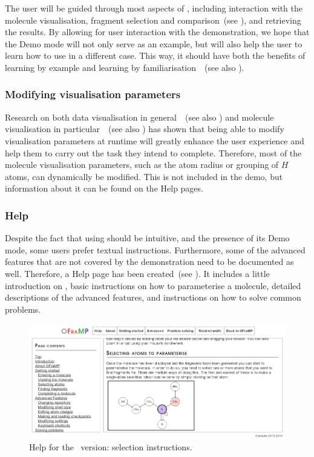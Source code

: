 The user will be guided through most aspects of \oframp, including interaction with the molecule visualisation, fragment selection and comparison~(see ), and retrieving the results. By allowing for user interaction with the demonstration, we hope that the Demo mode will not only serve as an example, but will also help the user to learn how to use \oframp{} in a different case. This way, it should have both the benefits of learning by example and learning by familiarisation~\cite{sweller1994cognitive}~(see also ).

\subsubsection{Modifying visualisation parameters}
Research on both data visualisation in general~\cite{gallopoulos1994computer}~(see also ) and molecule visualisation in particular~\cite{aksela2008computer,taylor2013interface}~(see also ) has shown that being able to modify visualisation parameters at runtime will greatly enhance the user experience and help them to carry out the task they intend to complete. Therefore, most of the molecule visualisation parameters, such as the atom radius or grouping of $H$ atoms, can dynamically be modified. This is not included in the demo, but information about it can be found on the \oframp{} Help pages.

\subsubsection{Help}
Despite the fact that using \oframp{} should be intuitive, and the presence of its Demo mode, some users prefer textual instructions. Furthermore, some of the advanced features that are not covered by the demonstration need to be documented as well. Therefore, a Help page has been created~(see ). It includes a little introduction on \oframp, basic instructions on how to parameterise a molecule, detailed descriptions of the advanced features, and instructions on how to solve common problems.

\begin{figure}
\center
\includegraphics[width=.9\textwidth]{img/help.png}
\caption{\oframp{} Help for the \IDa\ version: selection instructions.}
\end{figure}


